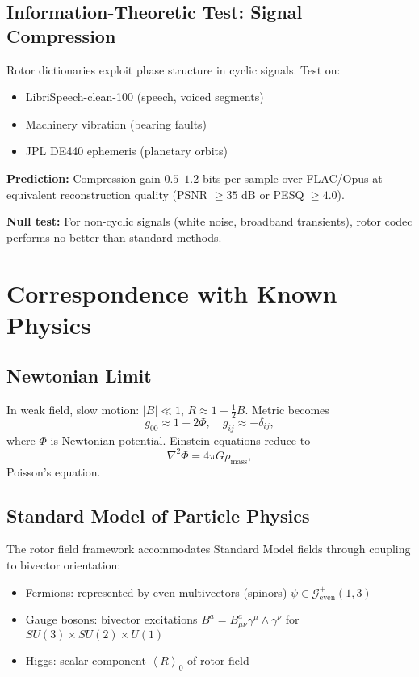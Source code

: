 \documentclass[11pt,a4paper]{article}
\numberwithin{equation}{section}
\theoremstyle{plain}
\theoremstyle{definition}
\theoremstyle{remark}
\newcommand{\Cl}{\mathcal{G}}               %
\newcommand{\grade}[2]{\left\langle #1 \right\rangle_{#2}}
\newcommand{\scal}[1]{\grade{#1}{0}}       %
\begin{document}
\subsection{Information-Theoretic Test: Signal Compression}

Rotor dictionaries exploit phase structure in cyclic signals. Test on:
\begin{itemize}
\item LibriSpeech-clean-100 (speech, voiced segments)
\item Machinery vibration (bearing faults)
\item JPL DE440 ephemeris (planetary orbits)
\end{itemize}

\textbf{Prediction:} Compression gain $0.5$–$1.2$ bits-per-sample over FLAC/Opus at equivalent reconstruction quality (PSNR $\geq 35$ dB or PESQ $\geq 4.0$).

\textbf{Null test:} For non-cyclic signals (white noise, broadband transients), rotor codec performs no better than standard methods.

\section{Correspondence with Known Physics}
\label{sec:correspondence}

\subsection{Newtonian Limit}

In weak field, slow motion: $|B| \ll 1$, $R \approx 1 + \frac{1}{2}B$. Metric becomes
\begin{equation}
g_{00} \approx 1 + 2\Phi, \quad g_{ij} \approx -\delta_{ij},
\end{equation}
where $\Phi$ is Newtonian potential. Einstein equations reduce to
\begin{equation}
\nabla^2\Phi = 4\pi G\rho_{\mathrm{mass}},
\end{equation}
Poisson's equation.

\subsection{Standard Model of Particle Physics}

The rotor field framework accommodates Standard Model fields through coupling to bivector orientation:
\begin{itemize}
\item Fermions: represented by even multivectors (spinors) $\psi \in \Cl^+_{\mathrm{even}}(1,3)$
\item Gauge bosons: bivector excitations $B^a = B^a_{\mu\nu}\gamma^\mu \wedge \gamma^\nu$ for $SU(3) \times SU(2) \times U(1)$
\item Higgs: scalar component $\scal{R}$ of rotor field
\end{itemize}
\end{document}
